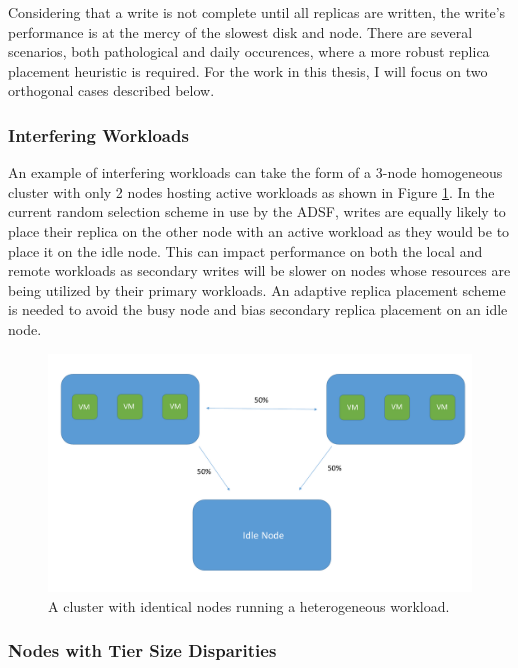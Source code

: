 \documentclass[12pt]{article}
\begin{document}
  Considering that a write is not complete until all replicas are written, the
  write's performance is at the mercy of the slowest disk and node.  There are
  several scenarios, both pathological and daily occurences, where a more
  robust replica placement heuristic is required. For the work in this thesis,
  I will focus on two orthogonal cases described below.

    \subsubsection{Interfering Workloads}

    An example of interfering workloads can take the form of a 3-node
    homogeneous cluster with only 2 nodes hosting active workloads as shown in
    Figure \ref{fig:workload_disparity}. In the current random selection scheme
    in use by the ADSF, writes are equally likely to place their replica on the
    other node with an active workload as they would be to place it on the idle
    node. This can impact performance on both the local and remote workloads as
    secondary writes will be slower on nodes whose resources are being utilized
    by their primary workloads. An adaptive replica placement scheme is needed
    to avoid the busy node and bias secondary replica placement on an idle
    node. 

    \begin{figure}[h]
      \centering
      \includegraphics[scale=0.4]{images/homogeneous_workload_disparity.pdf} 
      \caption{A cluster with identical nodes running a heterogeneous workload.}
      \label{fig:workload_disparity}
    \end{figure}

    \subsubsection{Nodes with Tier Size Disparities}
\end{document}
